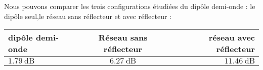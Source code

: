 Nous pouvons comparer les trois configurations étudiées du dipôle demi-onde : le dipôle seul,le réseau sans réflecteur et avec réflecteur :

\begin{tabular}{|l|c|r|}
  \hline
       dipôle demi-onde & Réseau sans réflecteur & réseau avec réflecteur \\
  \hline
  $\SI{1.79}{\deci\bel}$ & $\SI{6.27}{\deci\bel}$ & $\SI{11.46}{\deci\bel}$ \\
  \hline
\end{tabular}

